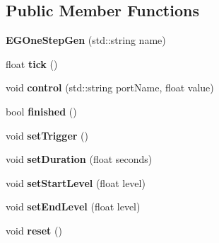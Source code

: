 \subsection*{Public Member Functions}
\begin{DoxyCompactItemize}
\item 
{\bfseries E\+G\+One\+Step\+Gen} (std\+::string name)\hypertarget{classunit_1_1EGOneStepGen_a9bc697acabed6c7b0467369ba073ede1}{}\label{classunit_1_1EGOneStepGen_a9bc697acabed6c7b0467369ba073ede1}

\item 
float {\bfseries tick} ()\hypertarget{classunit_1_1EGOneStepGen_a74df96649d7a66d19cb33bf9bf13f54a}{}\label{classunit_1_1EGOneStepGen_a74df96649d7a66d19cb33bf9bf13f54a}

\item 
void {\bfseries control} (std\+::string port\+Name, float value)\hypertarget{classunit_1_1EGOneStepGen_a8979594fb226c732a9b8232664f09047}{}\label{classunit_1_1EGOneStepGen_a8979594fb226c732a9b8232664f09047}

\item 
bool {\bfseries finished} ()\hypertarget{classunit_1_1EGOneStepGen_ae9f187e0f266559a80e4f4b534d79f78}{}\label{classunit_1_1EGOneStepGen_ae9f187e0f266559a80e4f4b534d79f78}

\item 
void {\bfseries set\+Trigger} ()\hypertarget{classunit_1_1EGOneStepGen_af94a0976e166a3f53b7bf14de58f81d6}{}\label{classunit_1_1EGOneStepGen_af94a0976e166a3f53b7bf14de58f81d6}

\item 
void {\bfseries set\+Duration} (float seconds)\hypertarget{classunit_1_1EGOneStepGen_aaf02138e168cad06cb955944f57ce93c}{}\label{classunit_1_1EGOneStepGen_aaf02138e168cad06cb955944f57ce93c}

\item 
void {\bfseries set\+Start\+Level} (float level)\hypertarget{classunit_1_1EGOneStepGen_af2b5bd8522fac9dc997d78d3750cdbbb}{}\label{classunit_1_1EGOneStepGen_af2b5bd8522fac9dc997d78d3750cdbbb}

\item 
void {\bfseries set\+End\+Level} (float level)\hypertarget{classunit_1_1EGOneStepGen_a3d58403aa5bebffeaf3f326855e0a233}{}\label{classunit_1_1EGOneStepGen_a3d58403aa5bebffeaf3f326855e0a233}

\item 
void {\bfseries reset} ()\hypertarget{classunit_1_1EGOneStepGen_a4898b08a0687e03802abdb7945708cab}{}\label{classunit_1_1EGOneStepGen_a4898b08a0687e03802abdb7945708cab}

\end{DoxyCompactItemize}
